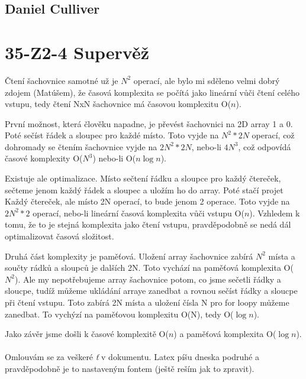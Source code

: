 \documentclass[12pt]{article}
\begin{document}
\subsection*{Daniel Culliver}
\section*{35-Z2-4 Supervěž}
Čtení šachovnice samotné už je $N^2$ operací, ale bylo mi sděleno velmi dobrý zdojem (Matúšem), 
že časová komplexita se počítá jako lineární vůči čtení celého vstupu, tedy čtení NxN šachovnice má časovou komplexitu O($n$). 

První možnost, která člověku napadne, je převést šachovnici na 2D array 1 a 0.
Poté sečíst řádek a sloupec pro každé místo.
Toto vyjde na $N^2 * 2N$ operací, což dohromady se čtením šachovnice vyjde na
$2N^2 * 2N$, nebo-li $4N^3$, což odpovídá časové komplexity O($N^3$) nebo-li O($n \log{n}$).

Existuje ale optimalizace. Místo sečtení řádku a sloupce pro každý čtereček,
sečteme jenom každý řádek a sloupec a uložím ho do array.
Poté stačí projet Každý čtereček, ale místo 2N operací, to bude jenom 2 operace.
Toto vyjde na $2N^2 * 2$ operací, nebo-li lineární časová komplexita vůči vstupu O($n$).
Vzhledem k tomu, že to je stejná komplexita jako čtení vstupu,
pravděpodobně se nedá dál optimalizovat časová složitost.

Druhá část komplexity je paměťová. Uložení array šachovnice zabírá $N^2$ místa
a součty rádků a sloupců je dalších 2N. Toto vychází na paměťová komplexita O($N^2$).
Ale my nepotřebujeme array šachovnice potom, co jsme sečetli řádky a sloucpe,
tudíž můžeme ukládání arraye zanedbat a rovnou sečíst řádky a sloucpe při čtení vstupu.
Toto zabírá 2N místa a uložení čísla N pro for loopy můžeme zanedbat.
To vychýzí na paměťovou komplexitu O(N), tedy O($\log{n}$).

Jako závěr jsme došli k časové komplexitě O($n$) a paměťová komplexita O($\log{n}$).
\\\\
Omlouvám se za veškeré \emph{ť} v dokumentu. Latex píšu dneska podruhé a pravděpodobně je to nastaveným fontem (ještě reším jak to zpravit).
\end{document}
